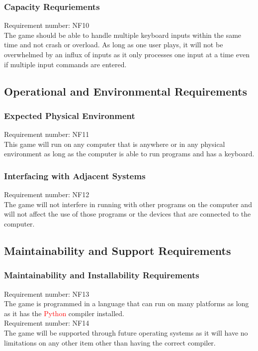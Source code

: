 \documentclass[12pt, titlepage]{article}
\begin{document}
\subsubsection{Capacity Requriements}
Requirement number: NF10
\\The game should be able to handle multiple keyboard inputs within the same time and not crash or overload. As long as one user plays, it will not be overwhelmed by an influx of inputs as it only processes one input at a time even if multiple input commands are entered. 

\subsection{Operational and Environmental Requirements}

\subsubsection{Expected Physical Environment}
Requirement number: NF11
\\This game will run on any computer that is anywhere or in any physical environment as long as the computer is able to run programs and has a keyboard. 

\subsubsection{Interfacing with Adjacent Systems}
Requirement number:  NF12
\\The game will not interfere in running with other programs on the computer and will not affect the use of those programs or the devices that are connected to the computer.

\subsection{Maintainability and Support Requirements}

\subsubsection{Maintainability and Installability Requirements}
Requirement number: NF13
\\The game is programmed in a language that can run on many platforms as long as it has the \textcolor{red}{Python} compiler installed. 
\smallskip
\\Requirement number: NF14
\\The game will be supported through future operating systems as it will have no limitations on any other item other than having the correct compiler.
\end{document}
